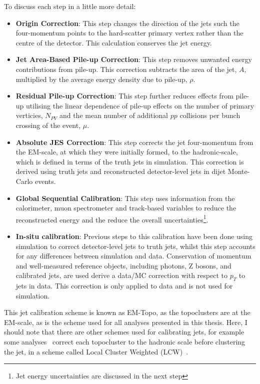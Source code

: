 \noindent
To discuss each step in a little more detail:
\begin{itemize}
\item\textbf{Origin Correction}:
  This step changes the direction of the jets such the four-momentum points to the hard-scatter primary vertex
  rather than the centre of the detector.
  This calculation conserves the jet energy.
\item\textbf{Jet Area-Based Pile-up Correction}:
  This step removes unwanted energy contributions from pile-up.
  This correction subtracts the area of the jet, $A$, multiplied by the average energy density due to pile-up, $\rho$.
\item\textbf{Residual Pile-up Correction}:
  This step further reduces effects from pile-up utilising the linear dependence of pile-up effects on
  the number of primary verticies, $N_{PV}$
  and the mean number of additional $pp$ collisions per bunch crossing of the event, $\mu$.
\item\textbf{Absolute JES Correction}:
  This step corrects the jet four-momentum from the EM-scale, at which they were initially formed,
  to the hadronic-scale, which is defined in terms of the truth jets in simulation.
  This correction is derived using truth jets and reconstructed detector-level jets in dijet Monte-Carlo events.
\item\textbf{Global Sequential Calibration}:
  This step uses information from the calorimeter, muon spectrometer and track-based variables
  to reduce the reconstructed energy and the reduce the overall uncertainties\footnote{Jet energy uncertainties are discussed in the next step}.
\item\textbf{In-situ calibration}:
  Previous steps to this calibration have been done using simulation to correct
  detector-level jets to truth jets, whilst this step accounts for any differences between simulation and data.
  Conservation of momentum and well-measured reference objects, including photons, Z bosons, and calibrated jets,
  are used derive a data/MC correction with respect to $p_T$ to jets in data.
  This correction is only applied to data and is not used for simulation.
\end{itemize}

This jet calibration scheme is known as EM-Topo, as the topoclusters are at the EM-scale,
as is the  scheme used for all analyses presented in this thesis.
Here, I should note that there are other schemes used for calibrating jets,
for example some analyses~\cite{obj-VVjj} correct each topocluster to the hadronic scale
before clustering the jet, in a scheme called Local Cluster Weighted (LCW)~\cite{obj-jets_topo}.

